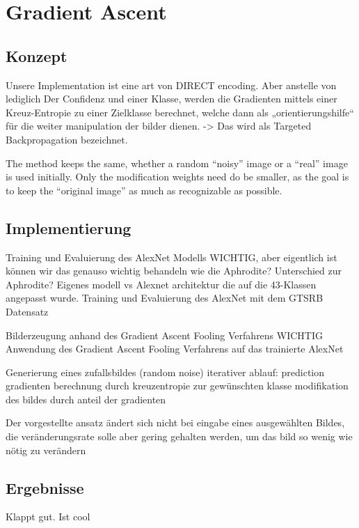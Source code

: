 \chapter{Gradient Ascent}
\label{GenAlgo}
\section{Konzept}
Unsere Implementation ist eine art von DIRECT encoding. Aber anstelle von lediglich Der Confidenz und einer Klasse, werden die Gradienten mittels einer Kreuz-Entropie zu einer Zielklasse berechnet, welche dann als „orientierungshilfe“ für die weiter manipulation der bilder dienen. -> Das wird als Targeted Backpropagation bezeichnet.


The method keeps the same, whether a random “noisy” image or a “real” image is used initially. Only the modification weights need do be smaller, as the goal is to keep the “original image” as much as recognizable as possible.

\section{Implementierung}
Training und Evaluierung des AlexNet Modells
WICHTIG, aber eigentlich ist können wir das genauso wichtig behandeln wie die Aphrodite?
Unterschied zur Aphrodite? Eigenes modell vs Alexnet architektur die auf die 43-Klassen angepasst wurde. 
Training und Evaluierung des AlexNet mit dem GTSRB Datensatz


Bilderzeugung anhand des Gradient Ascent Fooling Verfahrens
WICHTIG
Anwendung des Gradient Ascent Fooling Verfahrens auf das trainierte AlexNet


Generierung eines zufallsbildes (random noise)
iterativer ablauf: 
prediction
gradienten berechnung durch kreuzentropie zur gewünschten klasse
modifikation des bildes durch anteil der gradienten 

Der vorgestellte ansatz ändert sich nicht bei eingabe eines ausgewählten Bildes, die veränderungsrate solle aber gering gehalten werden, um das bild so wenig wie nötig zu verändern

\section{Ergebnisse}


Klappt gut. Ist cool